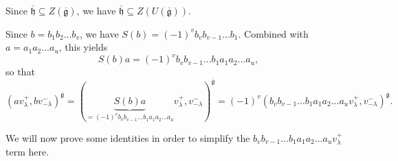 \documentclass
[numbers=enddot,12pt,final,onecolumn,german,notitlepage]{scrartcl}%
\theoremstyle{definition}
\begin{document}
Since $\overline{\mathfrak{h}}\subseteq Z\left(  \overline{\mathfrak{g}%
}\right)  $, we have $\overline{\mathfrak{h}}\subseteq Z\left(  U\left(
\overline{\mathfrak{g}}\right)  \right)  $.

Since $b=b_{1}b_{2}...b_{v}$, we have $S\left(  b\right)  =\left(  -1\right)
^{v}b_{v}b_{v-1}...b_{1}$. Combined with $a=a_{1}a_{2}...a_{u}$, this yields%
\[
S\left(  b\right)  a=\left(  -1\right)  ^{v}b_{v}b_{v-1}...b_{1}a_{1}%
a_{2}...a_{u},
\]
so that%
\begin{equation}
\left(  av_{\lambda}^{+},bv_{-\lambda}^{-}\right)  ^{\overline{\mathfrak{g}}%
}=\left(  \underbrace{S\left(  b\right)  a}_{=\left(  -1\right)  ^{v}%
b_{v}b_{v-1}...b_{1}a_{1}a_{2}...a_{u}}v_{\lambda}^{+},v_{-\lambda}%
^{-}\right)  ^{\overline{\mathfrak{g}}}=\left(  -1\right)  ^{v}\left(
b_{v}b_{v-1}...b_{1}a_{1}a_{2}...a_{u}v_{\lambda}^{+},v_{-\lambda}^{-}\right)
^{\overline{\mathfrak{g}}}. \label{prop.det.US.pf.4}%
\end{equation}


We will now prove some identities in order to simplify the $b_{v}%
b_{v-1}...b_{1}a_{1}a_{2}...a_{u}v_{\lambda}^{+}$ term here.
\end{document}
